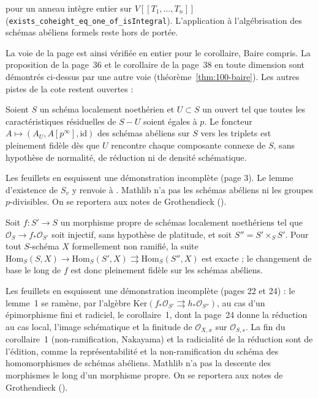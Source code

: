 pour un anneau intègre entier sur $V[[T_1, \ldots, T_n]]$ (\texttt{exists\_coheight\_eq\_one\_of\_isIntegral}). L'application à l'algébrisation des schémas abéliens formels reste hors de portée.\par\endgroup

La voie de la page est ainsi vérifiée en entier pour le corollaire, Baire compris. La proposition de la page~36 et le corollaire de la page~38 en toute dimension sont démontrés ci-dessus par une autre voie (théorème~\ref{thm:100-baire}). Les autres pistes de la cote restent ouvertes :

\begin{encadre}
\begin{theoreme*}\nonverifie
Soient $S$ un schéma localement noethérien et $U \subset S$ un ouvert tel que toutes les caractéristiques résiduelles de $S - U$ soient égales à $p$. Le foncteur $A \mapsto (A_U, A[p^\infty], \mathrm{id})$ des schémas abéliens sur $S$ vers les triplets est pleinement fidèle dès que $U$ rencontre chaque composante connexe de $S$, sans hypothèse de normalité, de réduction ni de densité schématique.
\end{theoreme*}
\end{encadre}
{\small Les feuillets en esquissent une démonstration incomplète (page 3). Le lemme d'existence de $S_v$ y renvoie à . Mathlib n'a pas les schémas abéliens ni les groupes $p$-divisibles. On se reportera aux notes de Grothendieck ().\par}

\begin{encadre}
\begin{theoreme*}\nonverifie
Soit $f : S' \to S$ un morphisme propre de schémas localement noethériens tel que $\mathcal O_S \to f_*\mathcal O_{S'}$ soit injectif, sans hypothèse de platitude, et soit $S'' = S' \times_S S'$. Pour tout $S$-schéma $X$ formellement non ramifié, la suite $\mathrm{Hom}_S(S, X) \to \mathrm{Hom}_S(S', X) \rightrightarrows \mathrm{Hom}_S(S'', X)$ est exacte ; le changement de base le long de $f$ est donc pleinement fidèle sur les schémas abéliens.
\end{theoreme*}
\end{encadre}
{\small Les feuillets en esquissent une démonstration incomplète (pages 22 et 24) : le lemme~1 se ramène, par l'algèbre $\mathrm{Ker}(f_*\mathcal O_{S'} \rightrightarrows h_*\mathcal O_{S''})$, au cas d'un épimorphisme fini et radiciel, le corollaire~1, dont la page~24 donne la réduction au cas local, l'image schématique et la finitude de $\mathcal O_{X,x}$ sur $\mathcal O_{S,s}$. La fin du corollaire~1 (non-ramification, Nakayama) et la radicialité de la réduction sont de l'édition, comme la représentabilité et la non-ramification du schéma des homomorphismes de schémas abéliens. Mathlib n'a pas la descente des morphismes le long d'un morphisme propre. On se reportera aux notes de Grothendieck ().\par}

